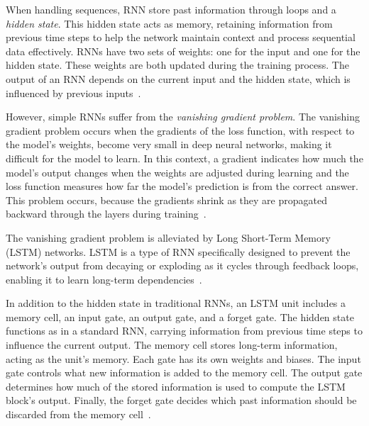 \documentclass[a4paper,oneside,onecolumn,12pt]{book}
\begin{document}
		When handling sequences, RNN store past information through loops and a \textit{hidden state}. This hidden state acts as memory, retaining information from previous time steps to help the network maintain context and process sequential data effectively. RNNs have two sets of weights: one for the input and one for the hidden state. These weights are both updated during the training process. The output of an RNN depends on the current input and the hidden state, which is influenced by previous inputs~\cite{HLSTMW}.

		However, simple RNNs suffer from the \textit{vanishing gradient problem}. The vanishing gradient problem occurs when the gradients of the loss function, with respect to the model's weights, become very small in deep neural networks, making it difficult for the model to learn. In this context, a gradient indicates how much the model's output changes when the weights are adjusted during learning and the loss function measures how far the model's prediction is from the correct answer. This problem occurs, because the gradients shrink as they are propagated backward through the layers during training~\cite{VGPCCS}.

		The vanishing gradient problem is alleviated by Long Short-Term Memory (LSTM) networks. LSTM is a type of RNN specifically designed to prevent the network's output from decaying or exploding as it cycles through feedback loops, enabling it to learn long-term dependencies~\cite{LSTM}.

		In addition to the hidden state in traditional RNNs, an LSTM unit includes a memory cell, an input gate, an output gate, and a forget gate. The hidden state functions as in a standard RNN, carrying information from previous time steps to influence the current output. The memory cell stores long-term information, acting as the unit's memory. Each gate has its own weights and biases. The input gate controls what new information is added to the memory cell. The output gate determines how much of the stored information is used to compute the LSTM block’s output. Finally, the forget gate decides which past information should be discarded from the memory cell~\cite{HLSTMW}.
		
\end{document}
